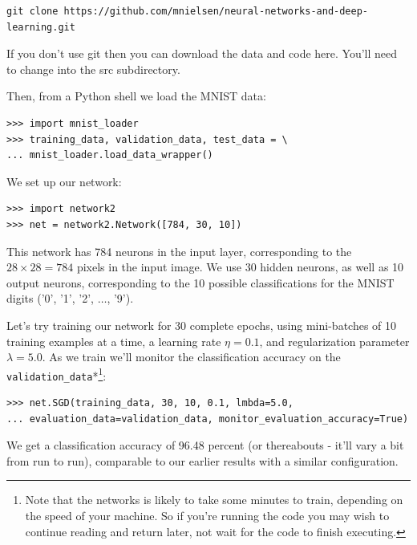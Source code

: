 \begin{lstlisting}
git clone https://github.com/mnielsen/neural-networks-and-deep-learning.git

\end{lstlisting}


If you don't use git then you can download the data and code here. You'll need to change into the src subdirectory.


Then, from a Python shell we load the MNIST data:



\begin{lstlisting}
>>> import mnist_loader
>>> training_data, validation_data, test_data = \
... mnist_loader.load_data_wrapper()

\end{lstlisting}


We set up our network:



\begin{lstlisting}
>>> import network2
>>> net = network2.Network([784, 30, 10])

\end{lstlisting}


This network has 784 neurons in the input layer, corresponding to the $28 \times 28 = 784$ pixels in the input image. We use 30 hidden neurons, as well as 10 output neurons, corresponding to the 10 possible classifications for the MNIST digits ('0', '1', '2', $\ldots$, '9').


Let's try training our network for 30 complete epochs, using mini-batches of 10 training examples at a time, a learning rate $\eta = 0.1$, and regularization parameter $\lambda = 5.0$. As we train we'll monitor the classification accuracy on the \texttt{validation\_\allowbreak{}data}*\footnote{Note that the networks is likely to take some minutes to train, depending on the speed of your machine. So if you're running the code you may wish to continue reading and return later, not wait for the code to finish executing.}:



\begin{lstlisting}
>>> net.SGD(training_data, 30, 10, 0.1, lmbda=5.0, 
... evaluation_data=validation_data, monitor_evaluation_accuracy=True)

\end{lstlisting}


We get a classification accuracy of 96.48 percent (or thereabouts - it'll vary a bit from run to run), comparable to our earlier results with a similar configuration.


